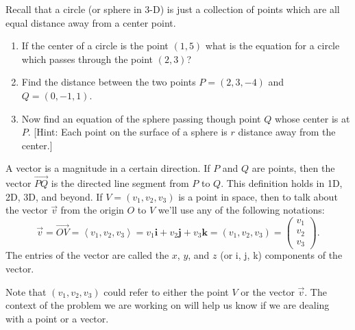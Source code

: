 \begin{problem}
Recall that a circle (or sphere in 3-D) is just a collection of points which are all equal distance away from a center point.
\begin{enumerate}
\item If the center of a circle is the point $(1,5)$ what is the equation for a circle which passes through the point $(2,3)$?
\item Find the distance between the two points $P=(2,3,-4)$ and $Q=(0,-1,1)$. 
\item Now find an equation of the sphere passing though point $Q$ whose center is at $P$. [Hint: Each point on the surface of a sphere is $r$ distance away from the center.]
\end{enumerate}
\end{problem}



\begin{definition}
A vector is a magnitude in a certain direction.  
If $P$ and $Q$ are points, then the vector $\vec{PQ}$ is the directed line segment from $P$ to $Q$. This definition holds in 1D, 2D, 3D, and beyond.  
If $V=(v_1,v_2,v_3)$ is a point in space, then to talk about the vector $\vec v$ from the origin $O$ to $V$ we'll use any of the following notations:
$$\vec v = \vec{OV}=\left<v_1,v_2,v_3\right> 
= v_1\mathbf{i}+v_2\mathbf{j}+v_3\mathbf{k} 
= (v_1,v_2,v_3) 
= \begin{pmatrix}v_1\\ v_2\\ v_3\end{pmatrix}
.$$
The entries of the vector are called the $x$, $y$, and $z$ (or i, j, k) components of the vector. 
\end{definition}
Note that $(v_1,v_2,v_3)$ could refer to either the point $V$ or the vector $\vec v$. The context of the problem we are working on will help us know if we are dealing with a point or a vector.

